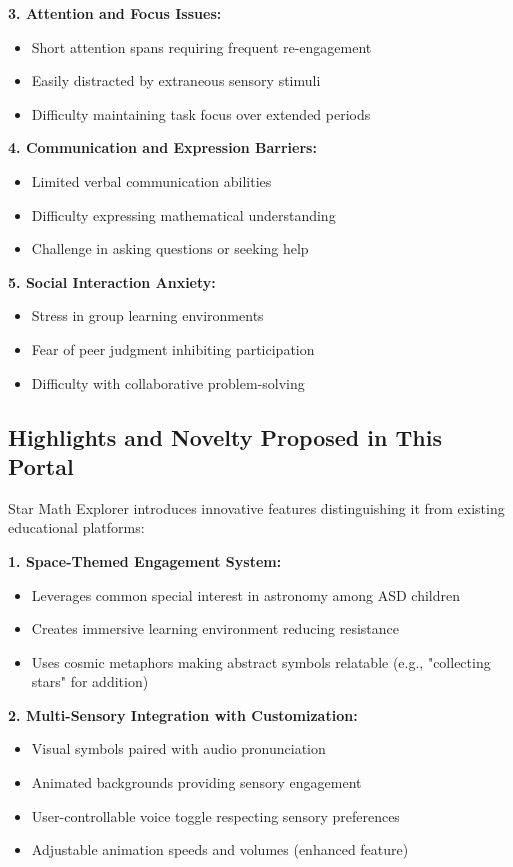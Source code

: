 \documentclass[11pt, a4paper]{article}
\begin{document}
\textbf{3. Attention and Focus Issues:}
\begin{itemize}[leftmargin=*, noitemsep]
    \item Short attention spans requiring frequent re-engagement
    \item Easily distracted by extraneous sensory stimuli
    \item Difficulty maintaining task focus over extended periods
\end{itemize}

\textbf{4. Communication and Expression Barriers:}
\begin{itemize}[leftmargin=*, noitemsep]
    \item Limited verbal communication abilities
    \item Difficulty expressing mathematical understanding
    \item Challenge in asking questions or seeking help
\end{itemize}

\textbf{5. Social Interaction Anxiety:}
\begin{itemize}[leftmargin=*, noitemsep]
    \item Stress in group learning environments
    \item Fear of peer judgment inhibiting participation
    \item Difficulty with collaborative problem-solving
\end{itemize}

\subsection{Highlights and Novelty Proposed in This Portal}

Star Math Explorer introduces innovative features distinguishing it from existing educational platforms:

\textbf{1. Space-Themed Engagement System:}
\begin{itemize}[leftmargin=*, noitemsep]
    \item Leverages common special interest in astronomy among ASD children
    \item Creates immersive learning environment reducing resistance
    \item Uses cosmic metaphors making abstract symbols relatable (e.g., "collecting stars" for addition)
\end{itemize}

\textbf{2. Multi-Sensory Integration with Customization:}
\begin{itemize}[leftmargin=*, noitemsep]
    \item Visual symbols paired with audio pronunciation
    \item Animated backgrounds providing sensory engagement
    \item User-controllable voice toggle respecting sensory preferences
    \item Adjustable animation speeds and volumes (enhanced feature)
\end{itemize}
\end{document}
